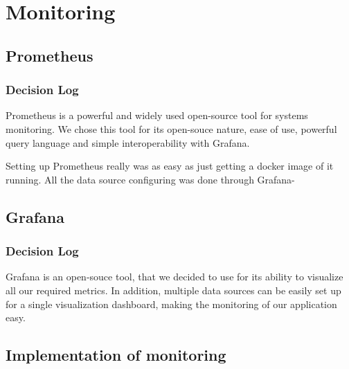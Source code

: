 \section{Monitoring}
\subsection{Prometheus}
\subsubsection{Decision Log}

Prometheus is a powerful and widely used open-source tool for systems monitoring.
We chose this tool for its open-souce nature, ease of use, powerful query language and simple interoperability with Grafana.

Setting up Prometheus really was as easy as just getting a docker image of it running.
All the data source configuring was done through Grafana-%

\subsection{Grafana}

\subsubsection{Decision Log}

Grafana is an open-souce tool, that we decided to use for its ability to visualize all our required metrics. In addition, multiple data sources can be easily set up for a single visualization dashboard, making the monitoring of our application easy.


\subsection{Implementation of monitoring}

